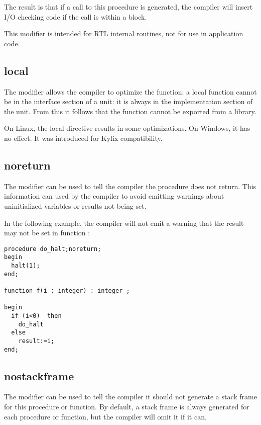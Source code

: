 The result is that if a call to this procedure is generated, the compiler will 
insert I/O checking code if the call is within a  block.

This modifier is intended for RTL internal routines, not for use in
application code.

\subsection{local}
\label{se:local}
The  modifier allows the compiler to optimize the function: a local
function cannot be in the interface section of a unit: it is always in the
implementation section of the unit. From this it follows that the function
cannot be exported from a library. 

On Linux, the local directive results in some optimizations. On Windows, it
has no effect. It was introduced for Kylix compatibility.

\subsection{noreturn}
\label{se:noreturn}
The  modifier can be used to tell the compiler the procedure
does not return. This information can used by the compiler to avoid emitting
warnings about uninitialized variables or results not being set. 

In the following example, the compiler will not emit a warning that the
result may not be set in function :
\begin{verbatim}
procedure do_halt;noreturn;
begin
  halt(1);
end;

function f(i : integer) : integer ;

begin
  if (i<0)  then
    do_halt
  else
    result:=i;
end;
\end{verbatim}

\subsection{nostackframe}
\label{se:nostackframe}
The  modifier can be used to tell the compiler it should
not generate a stack frame for this procedure or function. By default, a
stack frame is always generated for each procedure or function, but the compiler
will omit it if it can.

